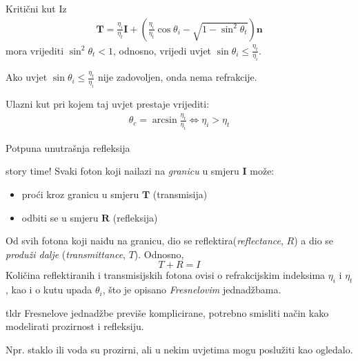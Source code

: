 \documentclass[9pt]{beamer}
\begin{document}
\begin{frame}{Kritični kut}
	Iz \begin{align*}
	\mathbf{T} = \frac{\eta_i}{\eta_t}\mathbf{I} + \left(\frac{\eta_i}{\eta_t} \cos \theta_i - \sqrt{1- \sin^2 \theta_t}\right)\mathbf{n}
	\end{align*}
	mora vrijediti $\sin^2 \theta_t < 1$, odnosno, vrijedi uvjet $\sin \theta_i \leq \frac{\eta_t}{\eta_i}$.
	
	\begin{block}{}
		Ako uvjet $\sin \theta_i \leq \frac{\eta_t}{\eta_i}$ \alert{nije} zadovoljen, onda nema \alert{refrakcije}.
		
		Ulazni kut pri kojem taj uvjet prestaje vrijediti: 
		\begin{align*}
			\theta_c = \arcsin \frac{\eta_t}{\eta_i} \Leftrightarrow \eta_i > \eta_t
		\end{align*}
	\end{block}
\end{frame}

\begin{frame}{Potpuna unutrašnja refleksija}
	\begin{block}{story time!}
		Svaki foton koji nailazi na \textit{granicu} u smjeru $\mathbf{I}$ može:
		\begin{itemize}
			\item proći kroz granicu u smjeru $\mathbf{T}$ (transmisija)
			\item odbiti se u smjeru  $\mathbf{R}$ (refleksija)
		\end{itemize}
		Od svih fotona koji naiđu na granicu, dio se reflektira(\textit{reflectance}, $R$) a dio se \textit{produži dalje} (\textit{transmittance}, $T$). Odnosno,
		$$T + R = I$$
		Količina reflektiranih i transmisijskih fotona ovisi o refrakcijskim indeksima $\eta_i$ i $\eta_t$, kao i o kutu
		upada $\theta_i$, što je opisano \textit{Fresnelovim} jednadžbama.
	\end{block}
	\begin{block}{tldr}
		Fresnelove jednadžbe previše komplicirane, potrebno smisliti način kako modelirati prozirnost i refleksiju.
		
		Npr. staklo ili voda su prozirni, ali u nekim uvjetima mogu poslužiti kao ogledalo.
	\end{block}
\end{frame}
\end{document}
